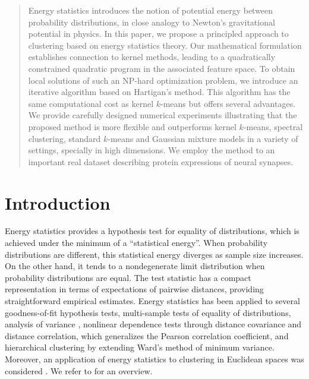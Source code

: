 \documentclass{article}
\begin{document}
\begin{abstract}
Energy statistics introduces the notion of potential
energy between probability distributions, in  
close analogy to Newton's gravitational
potential in physics. In this paper, we propose a principled approach to 
clustering based on energy statistics theory.
Our mathematical formulation establishes connection to kernel methods,
leading to a quadratically constrained quadratic program in the associated
feature space.
To obtain local solutions of such an NP-hard optimization problem,
we introduce an iterative algorithm based
on Hartigan's method. This algorithm has the same computational 
cost as kernel $k$-means but offers
several advantages. 
We provide carefully designed numerical experiments illustrating
that the proposed method is more flexible and outperforms
kernel $k$-means, spectral clustering,
standard $k$-means and Gaussian mixture models in a variety of settings,
specially in high dimensions. We employ the method 
to an important real dataset describing protein expressions
of neural synapses.
\end{abstract}


\section{Introduction}

Energy statistics \citep{Szkely2013}
provides a hypothesis test for equality of 
distributions, which is achieved 
under the minimum of a ``statistical energy''. 
When probability distributions are different, this
statistical energy diverges as sample size increases. On the other hand,
it tends to a nondegenerate limit distribution when probability
distributions are equal.
The test statistic has a compact representation
in terms of expectations of pairwise distances, providing
straightforward empirical estimates. Energy statistics
has been applied to several goodness-of-fit 
hypothesis tests, multi-sample tests of equality of distributions, 
analysis of variance \citep{RizzoVariance}, nonlinear dependence tests through
distance covariance and distance correlation, which generalizes the Pearson
correlation coefficient, and hierarchical clustering \citep{RizzoClustering} 
by extending Ward's method of minimum variance. Moreover, an application of 
energy statistics to clustering in Euclidean spaces was 
considered \citep{Kgroups}.  
We refer to \citep{Szkely2013} for an overview.
\end{document}
